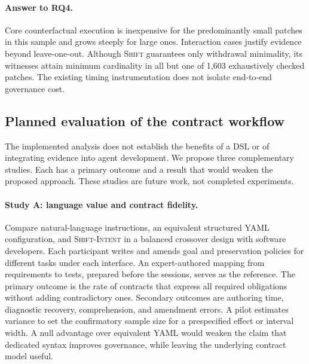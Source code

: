 \documentclass[a4paper,fleqn]{cas-sc}
\newcommand{\tool}{\textsc{Shift}}
\newcommand{\dsl}{\textsc{Shift-Intent}}
\begin{document}
\paragraph{Answer to RQ4.}
Core counterfactual execution is inexpensive for the predominantly small patches in this sample and grows steeply for large ones. Interaction cases justify evidence beyond leave-one-out. Although \tool{} guarantees only withdrawal minimality, its witnesses attain minimum cardinality in all but one of 1,603 exhaustively checked patches. The existing timing instrumentation does not isolate end-to-end governance cost.

\subsection{Planned evaluation of the contract workflow}\label{sec:future}

The implemented analysis does not establish the benefits of a DSL or of integrating evidence into agent development. We propose three complementary studies. Each has a primary outcome and a result that would weaken the proposed approach. These studies are future work, not completed experiments.

\paragraph{Study A: language value and contract fidelity.}
Compare natural-language instructions, an equivalent structured YAML configuration, and \dsl{} in a balanced crossover design with software developers. Each participant writes and amends goal and preservation policies for different tasks under each interface. An expert-authored mapping from requirements to tests, prepared before the sessions, serves as the reference. The primary outcome is the rate of contracts that express all required obligations without adding contradictory ones. Secondary outcomes are authoring time, diagnostic recovery, comprehension, and amendment errors. A pilot estimates variance to set the confirmatory sample size for a prespecified effect or interval width. A null advantage over equivalent YAML would weaken the claim that dedicated syntax improves governance, while leaving the underlying contract model useful.
\end{document}
